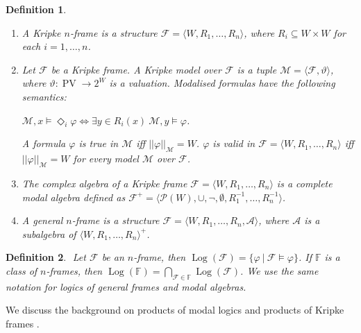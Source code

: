 \documentclass[a4paper]{article}
\theoremstyle{defin}
\newtheorem{defin}{Definition}
\theoremstyle{theorem}
\theoremstyle{prop}
\theoremstyle{lemma}
\theoremstyle{ex}
\theoremstyle{col}
\begin{document}
\begin{defin}
$ $
\begin{enumerate}
  \item A Kripke $n$-frame is a structure $\mathcal{F} = \langle W, R_1, \dots, R_n \rangle$, where $R_i \subseteq W \times W$ for each $i = 1,\dots, n$.
  \item Let $\mathcal{F}$ be a Kripke frame. A Kripke model over $\mathcal{F}$ is a tuple $\mathcal{M} = \langle \mathcal{F}, \vartheta \rangle$, where $\vartheta : \operatorname{PV} \to 2^W$ is a valuation. Modalised formulas have the following semantics:
  \begin{center}
    $\mathcal{M}, x \models \Diamond_i \varphi \Leftrightarrow \exists y \in R_i(x) \: \mathcal{M}, y \models \varphi$.
  \end{center}
  A formula $\varphi$ is true in $\mathcal{M}$ iff $||\varphi||_{\mathcal{M}} = W$. $\varphi$ is valid in $\mathcal{F} = \langle W, R_1, \dots, R_n \rangle$ iff $||\varphi||_{\mathcal{M}} = W$ for every model $\mathcal{M}$ over $\mathcal{F}$.
  \item The complex algebra of a Kripke frame $\mathcal{F} = \langle W, R_1, \dots, R_n \rangle$ is a complete modal algebra defined as $\mathcal{F}^{+} = \langle \mathcal{P}(W), \cup, \neg, \emptyset, R_1^{-1}, \dots, R_n^{-1} \rangle$.
  \item A general $n$-frame is a structure $\mathcal{F} = \langle W, R_1, \dots, R_n, \mathcal{A} \rangle$, where $\mathcal{A}$ is a subalgebra of $\langle W, R_1, \dots, R_n \rangle^{+}$.
\end{enumerate}
\end{defin}

\begin{defin}
$ $
  Let $\mathcal{F}$ be an $n$-frame, then $\operatorname{Log}(\mathcal{F}) = \{ \varphi \: | \: \mathcal{F} \models \varphi \}$. If $\mathbb{F}$ is a class of $n$-frames,
  then $\operatorname{Log}(\mathbb{F}) = \bigcap \limits_{\mathcal{F} \in \mathbb{F}} \operatorname{Log}(\mathcal{F})$. We use the same notation for logics of general frames and modal algebras.
\end{defin}

We discuss the background on products of modal logics and products of Kripke frames \cite{kurucz2007combining} \cite{kurucz2003many}.
\end{document}

